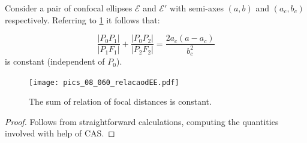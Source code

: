 \begin{proposition}
	Consider a pair of confocal ellipses $\mathcal{E}$ and $\mathcal{E}'$ with semi-axes $(a,b)$ and $(a_c,b_c)$ respectively. Referring to   \cref{fig:dEE1} it follows that:
	
	\[\frac{|P_0P_1|}{|P_1F_1|}+\frac{|P_0P_2|}{|P_2F_2|}=\frac{2 a_c (a-a_c)}{b_c^2}\]
	is constant (independent of $P_0$).
\label{prop:dEE1}	
\end{proposition}
\begin{figure}[h]
	\begin{center}	 
  \texttt{[image: pics\_08\_060\_relacaodEE.pdf]}
		\caption { The sum of relation of focal distances is constant. \label{fig:dEE1} }
	\end{center}
	
\end{figure}
\begin{proof} 
Follows from straightforward calculations, computing the quantities involved with help of CAS. 
\end{proof}

